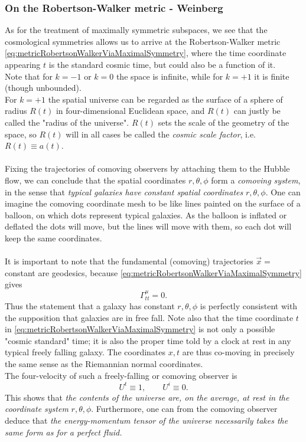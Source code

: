 \subsubsection{On the Robertson-Walker metric - Weinberg}
As for the treatment of maximally symmetric subspaces, we see that the cosmological symmetries allows us to arrive at the Robertson-Walker metric \ref{eq:metricRobertsonWalkerViaMaximalSymmetry}, where the time coordinate appearing $t$ is the standard cosmic time, but could also be a function of it.\\
Note that for $k=-1$ or $k=0$ the space is infinite, while for $k=+1$ it is finite (though unbounded).\\
For $k=+1$ the spatial universe can be regarded as the surface of a sphere of radius $R(t)$ in four-dimensional Euclidean space, and $R(t)$ can justly be called the "radius of the universe". $R(t)$ sets the scale of the geometry of the space, so $R(t)$ will in all cases be called the \emph{cosmic scale factor}, i.e. $R(t)\equiv a(t)$.
\\
\\
Fixing the trajectories of comoving observers by attaching them to the Hubble flow, we can conclude that the spatial coordinates $r,\theta,\phi$ form a \emph{comoving system}, in the sense that \emph{typical galaxies have constant spatial coordinates} $r,\theta,\phi$. One can imagine the comoving coordinate mesh to be like lines painted on the surface of a balloon, on which dots represent typical galaxies. As the balloon is inflated or deflated the dots will move, but the lines will move with them, so each dot will keep the same coordinates.\\
\\
It is important to note that the fundamental (comoving) trajectories $\vec{x}=$constant are geodesics, because \ref{eq:metricRobertsonWalkerViaMaximalSymmetry} gives
\begin{equation}
\Gamma^\mu_{tt} = 0.
\end{equation}
Thus the statement that a galaxy has constant $r,\theta,\phi$ is perfectly consistent with the supposition that galaxies are in free fall. Note also that the time coordinate $t$ in \ref{eq:metricRobertsonWalkerViaMaximalSymmetry} is not only a possible "cosmic standard" time; it is also the proper time told by a clock at rest in any typical freely falling galaxy. The coordinates $x,t$ are thus co-moving in precisely the same sense as the Riemannian normal coordinates.\\
The four-velocity of such a freely-falling or comoving observer is
\begin{equation}
U^t\equiv 1, \qquad U^i \equiv 0.
\end{equation}
This shows that \emph{the contents of the universe are, on the average, at rest in the coordinate system} $r,\theta,\phi$. Furthermore, one can from the comoving observer deduce that \emph{the energy-momentum tensor of the universe necessarily takes the same form as for a perfect fluid.}






